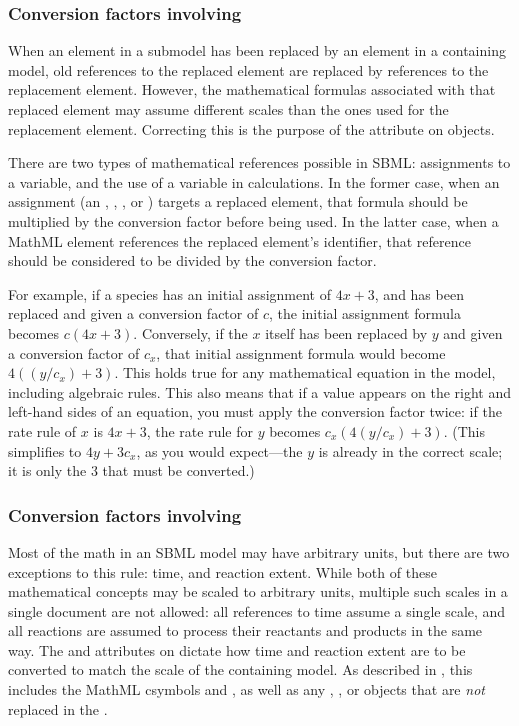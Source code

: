 \subsubsection{Conversion factors involving }

When an element in a submodel has been replaced by an element in a
containing model, old references to the replaced element are replaced by
references to the replacement element.  However, the mathematical
formulas associated with that replaced element may assume different
scales than the ones used for the replacement element.  Correcting this
is the purpose of the  attribute on
\ReplacedElement objects.

There are two types of mathematical references possible in SBML:  assignments
to a variable, and the use of a variable in calculations.  In the former
case, when an assignment (an \InitialAssignment, \EventAssignment, \AssignmentRule,
or \RateRule) targets a replaced element, that formula should be 
multiplied by the conversion factor before being used.  In the latter
case, when a MathML  element references the replaced element's identifier, that
reference should be considered to be divided by the conversion factor.

For example, if a species has an initial assignment of $4x + 3$, and has
been replaced and given a conversion factor of $c$, the initial assignment formula becomes
$c (4x+3)$.  Conversely, if the $x$ itself has
been replaced by $y$ and given a conversion factor of $c_x$, that initial
assignment formula would become $4((y/c_x)+3)$.  This holds true for any
mathematical equation in the model, including algebraic rules.  This
also means that if a value appears on the right and left-hand sides of
an equation, you must apply the conversion factor twice: if the rate
rule of $x$ is $4x+3$, the rate rule for $y$ becomes $c_x(4(y/c_x) + 3)$.  (This
simplifies to $4y + 3c_x$, as you would expect---the $y$ is already in
the correct scale; it is only the $3$ that must be converted.)



\subsubsection{Conversion factors involving }

Most of the math in an SBML model may have arbitrary units, but there
are two exceptions to this rule: time, and reaction extent.  While both
of these mathematical concepts may be scaled to arbitrary units,
multiple such scales in a single document are not allowed: all
references to time assume a single scale, and all reactions are assumed
to process their reactants and products in the same way.  The
 and 
attributes on \Submodel dictate how time and reaction extent are to be
converted to match the scale of the containing model.  As described in
, this includes the MathML csymbols
 and , as well as any \Delay, \KineticLaw, or
\RateRule objects that are \emph{not} replaced in the \Submodel.

